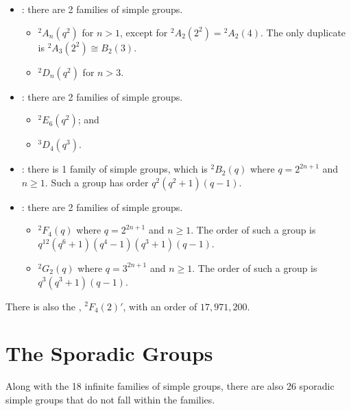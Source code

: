\begin{itemize}
    \item {}: there are 2 families of simple groups.
    \begin{itemize}
        \item ${^2A_n(q^2)}$ for $n > 1$, except for ${^2A_2(2^2)} = {^2A_2(4)}$. The only duplicate is ${^2A_3(2^2)} \cong B_2(3)$.
        \item ${^2D_n(q^2)}$ for $n > 3$.
    \end{itemize}

    \item {}: there are 2 families of simple groups.
    \begin{itemize}
        \item ${^2E_6(q^2)}$; and
        \item ${^3D_4(q^3)}$.
    \end{itemize}

    \item {}: there is 1 family of simple groups, which is ${^2B_2(q)}$ where $q = 2^{2n+1}$ and $n \geq 1$. Such a group has order $q^2(q^2+1)(q-1)$.

    \item {}: there are 2 families of simple groups.
    \begin{itemize}
        \item $^2F_4(q)$ where $q = 2^{2n+1}$ and $n \geq 1$. The order of such a group is $q^{12}(q^6+1)(q^4-1)(q^3+1)(q-1)$.
        \item $^2G_2(q)$ where $q = 3^{2n+1}$ and $n \geq 1$. The order of such a group is $q^3(q^3+1)(q-1)$.
    \end{itemize}
\end{itemize}

There is also the , $^2F_4(2)'$, with an order of $17,971,200$.

\section{The Sporadic Groups}
Along with the 18 infinite families of simple groups, there are also 26 sporadic simple groups that do not fall within the families.

